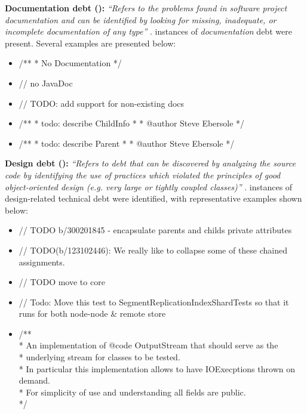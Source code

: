 \textbf{Documentation debt (\documentationCount{}):} \textit{``Refers to the problems found in software project documentation and can be identified by looking for missing, inadequate, or incomplete documentation of any type''} \cite{alves_towards_2014}. \documentationCount{} instances of \textit{documentation} debt were present. Several examples are presented below:
\begin{itemize}[itemsep=-2pt]
    \item \textcolor{commentColor}{/**
 * No Documentation
 */}
 \item \textcolor{commentColor}{// no JavaDoc}
 \item \textcolor{commentColor}{// TODO: add support for non-existing docs}
 \item \textcolor{commentColor}{/**
 * todo: describe ChildInfo
 *
 * @author Steve Ebersole
 */}
 \item \textcolor{commentColor}{/**
 * todo: describe Parent
 *
 * @author Steve Ebersole
 */}
\end{itemize}

\textbf{Design debt (\designCount{}):} \textit{``Refers to debt that can be discovered by analyzing the source code by identifying the use of practices which violated the principles of good object-oriented design (e.g. very large or tightly coupled classes)''} \cite{alves_towards_2014}. \designCount{} instances of design-related technical debt were identified, with representative examples shown below:
\begin{itemize}[itemsep=-2pt]
    \item \textcolor{commentColor}{// TODO b/300201845 - encapsulate parents and childs private attributes}
    \item \textcolor{commentColor}{// TODO(b/123102446): We really like to collapse some of these chained assignments.}
    \item \textcolor{commentColor}{// TODO move to core}
    \item \textcolor{commentColor}{// Todo: Move this test to SegmentReplicationIndexShardTests so that it runs for both node-node \& remote store}
    \item \textcolor{commentColor}{/**\\
 * An implementation of {@code OutputStream} that should serve as the\\
 * underlying stream for classes to be tested.\\
 * In particular this implementation allows to have IOExecptions thrown on demand.\\
 * For simplicity of use and understanding all fields are public.\\
 */}
\end{itemize}





